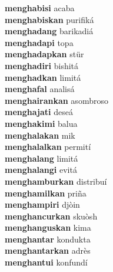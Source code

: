 \textbf{menghabisi } acaba \\
\textbf{menghabiskan } purifiká \\
\textbf{menghadang } barikadiá \\
\textbf{menghadapi } topa \\
\textbf{menghadapkan } stür \\
\textbf{menghadiri } bishitá \\
\textbf{menghadkan } limitá \\
\textbf{menghafal } analisá \\
\textbf{menghairankan } asombroso \\
\textbf{menghajati } deseá \\
\textbf{menghakimi } balua \\
\textbf{menghalakan } mik \\
\textbf{menghalalkan } permití \\
\textbf{menghalang } limitá \\
\textbf{menghalangi } evitá \\
\textbf{menghamburkan } distribuí \\
\textbf{menghamilkan } priña \\
\textbf{menghampiri } djòin \\
\textbf{menghancurkan } skuòsh \\
\textbf{menghanguskan } kima \\
\textbf{menghantar } kondukta \\
\textbf{menghantarkan } adrès \\
\textbf{menghantui } konfundí \\

